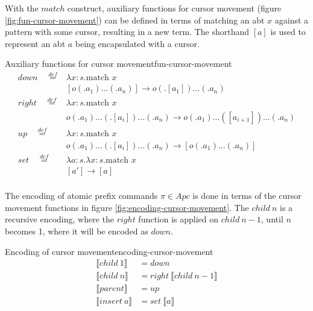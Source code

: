 With the $match$ construct, auxiliary functions for cursor movement (figure \ref{fig:fun-cursor-movement}) can be defined in terms of matching an abt $x$ against a pattern with some cursor, resulting in a new term. The shorthand $[a]$ is used to represent an abt $a$ being encapsulated with a cursor.

\begin{myfigure}{Auxiliary functions for cursor movement}{fun-cursor-movement}
    \[
        \begin{aligned}
            down \quad \stackrel{def}{=}  &
            \lambda x : s.\text{match } x                                                                           \\
                                          & [o (.a_1)...(.a_n)] \rightarrow o(.[a_1])...(.a_n)                      \\
            right \quad \stackrel{def}{=} &
            \lambda x : s.\text{match } x                                                                           \\
                                          & o (.a_1)...(.[a_i])...(.a_n) \rightarrow o(.a_1)...([a_{i+1}])...(.a_n) \\
            up \quad \stackrel{def}{=}    &
            \lambda x : s.\text{match } x                                                                           \\
                                          & o (.a_1)...(.[a_i])...(.a_n) \rightarrow [o(.a_1)...(.a_n)]             \\
            set \quad \stackrel{def}{=}   &
            \lambda a : s.\lambda x : s.\text{match } x                                                             \\
                                          & [a'] \rightarrow [a]                                                    \\
        \end{aligned}
    \]
\end{myfigure}

The encoding of atomic prefix commands $\pi \in Apc$ is done in terms of the cursor movement functions in figure \ref{fig:encoding-cursor-movement}. The $child \ n$ is a recursive encoding, where the $right$ function is applied on $child \ n - 1$, until $n$ becomes 1, where it will be encoded as $down$.

\begin{myfigure}{Encoding of cursor movement}{encoding-cursor-movement}
    \[
        \begin{aligned}
            \llbracket child \ 1 \rrbracket  & = down                                        \\
            \llbracket child \ n \rrbracket  & = right \ \llbracket child \ n - 1 \rrbracket \\
            \llbracket parent \rrbracket     & = up                                          \\
            \llbracket insert \ a \rrbracket & = set \ \llbracket a \rrbracket
        \end{aligned}
    \]
\end{myfigure}

